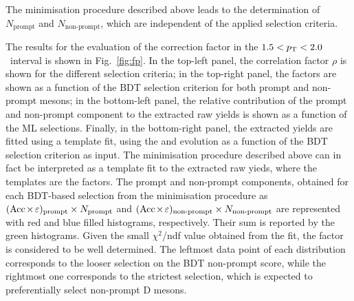 \begin{sloppypar}
The minimisation procedure described above leads to the determination of $N_\mathrm{prompt}$ and $N_\mathrm{non\text{-}prompt}$, which are independent of the applied selection criteria.

The results for the evaluation of the \ds \fp correction factor in the $1.5<p_\mathrm{T}<2.0$~\gevc interval is shown in Fig.~\ref{fig:fp}. In the top-left panel, the correlation factor $\rho$ is shown for the different selection criteria; in the top-right panel, the \aeff factors are shown as a function of the BDT selection criterion for both prompt and non-prompt \ds mesons; in the bottom-left panel, the relative contribution of the prompt and non-prompt component to the extracted \ds raw yields is shown as a function of the ML selections. Finally, in the bottom-right panel, the extracted yields are fitted using a template fit, using the \aeffpds and \aeffnpds evolution as a function of the BDT selection criterion as input. The minimisation procedure described above can in fact be interpreted as a template fit to the extracted raw yieds, where the templates are the \aeff factors. The prompt and non-prompt components, obtained for each BDT-based selection from the minimisation procedure as $(\mathrm{Acc}\mkern-2mu\times\mkern-2mu\varepsilon)_\mathrm{prompt}\times N_\mathrm{prompt}$ and $(\mathrm{Acc}\mkern-2mu\times\mkern-2mu\varepsilon)_\mathrm{non\text{-}prompt}\times N_\mathrm{non\text{-}prompt}$ are represented with red and blue filled histograms, respectively. Their sum is reported by the green histograms. Given the small $\chi^2$/ndf value obtained from the fit, the \fp factor is considered to be well determined. The leftmost data point of each distribution corresponds to the looser selection on the BDT non-prompt score, while the rightmost one corresponds to the strictest selection, which is expected to preferentially select non-prompt D mesons. 


\end{sloppypar}
